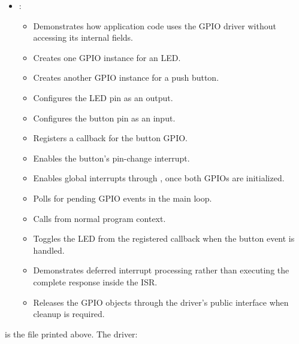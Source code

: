 \begin{itemize}
\begin{itemize}
    \item Contains function-like macros for common bit operations.
    \item Provides macros for setting bits in a hardware register.
    \item Provides macros for clearing bits in a hardware register.
    \item Provides macros for toggling bits in a hardware register.
    \item Provides macros for reading individual bits from a hardware register.
    \item Makes low-level register operations more readable.
    \item Reduces repetition in the GPIO driver implementation.
  \end{itemize}
  \item {}:
  \begin{itemize}
    \item Demonstrates how application code uses the GPIO driver without accessing its internal
      fields.
    \item Creates one GPIO instance for an LED.
    \item Creates another GPIO instance for a push button.
    \item Configures the LED pin as an output.
    \item Configures the button pin as an input.
    \item Registers a callback for the button GPIO.
    \item Enables the button's pin-change interrupt.
    \item Enables global interrupts through , once both GPIOs are
      initialized.
    \item Polls for pending GPIO events in the main loop.
    \item Calls  from normal program context.
    \item Toggles the LED from the registered callback when the button event is handled.
    \item Demonstrates deferred interrupt processing rather than executing the complete response
      inside the ISR.
    \item Releases the GPIO objects through the driver's public interface when cleanup is
      required.
  \end{itemize}
\end{itemize}
 is the file printed above. The driver:

